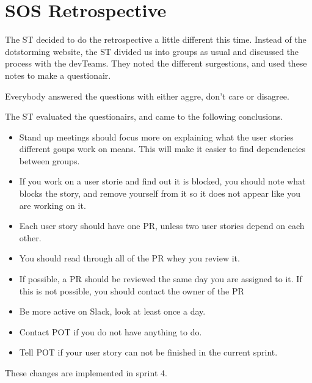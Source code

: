 \section{SOS Retrospective}

The \gls{ST} decided to do the retrospective a little different this time. Instead of the dotstorming website, the \gls{ST} divided us into groups as usual and discussed the process with the \glspl{devTeam}. They noted the different surgestions, and used these notes to make a questionair. 

Everybody answered the questions with either aggre, don't care or disagree. 

The \gls{ST} evaluated the questionairs, and came to the following conclusions. 

\begin{itemize}
    \item Stand up meetings should focus more on explaining what the user stories different goups work on means. This will make it easier to find dependencies between groups. 
    \item If you work on a user storie and find out it is blocked, you should note what blocks the story, and remove yourself from it so it does not appear like you are working on it.
    \item Each user story should have one \gls{PR}, unless two user stories depend on each other. 
    \item You should read through all of the \gls{PR} whey you review it.
    \item If possible, a \gls{PR} should be reviewed the same day you are assigned to it. If this is not possible, you should contact the owner of the \gls{PR}
    \item Be more active on Slack, look at least once a day.
    \item Contact \gls{POT} if you do not have anything to do.
    \item Tell \gls{POT} if your user story can not be finished in the current sprint. 
\end{itemize}

These changes are implemented in sprint 4. 